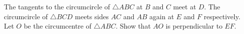 \documentclass[varwidth]{standalone}
\begin{document}
    The tangents to the circumcircle of $\triangle ABC$ at $B$ and $C$ meet at $D$. The circumcircle of $\triangle BCD$ meets sides $AC$ and $AB$ again at $E$ and $F$ respectively. Let $O$ be the circumcentre of $\triangle ABC$. Show that $AO$ is perpendicular to $EF$.
\end{document}
